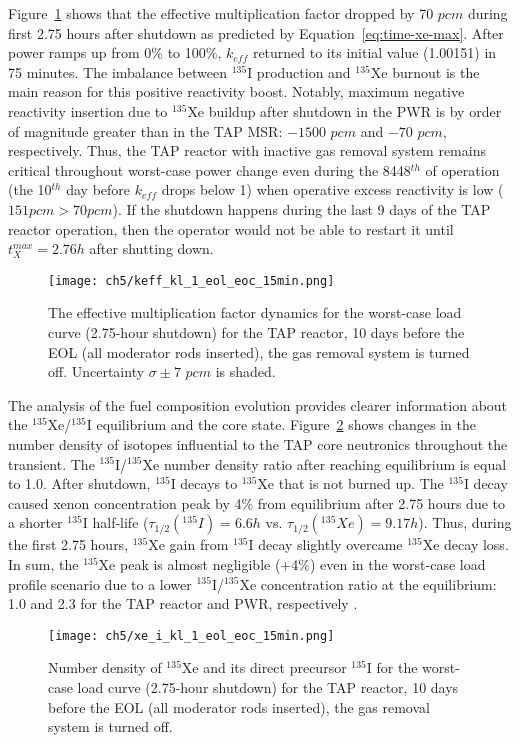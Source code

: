 Figure~\ref{fig:lf-tap-keff-eol-eoc-no-15} shows that the effective 
multiplication factor dropped by 70 $pcm$ during first 2.75 hours after 
shutdown as predicted by Equation~\ref{eq:time-xe-max}. After power ramps up 
from 0\% to 100\%, $k_{eff}$ returned to its initial value (1.00151) in 75 
minutes. The imbalance between $^{135}$I production and $^{135}$Xe burnout is 
the main reason for this positive reactivity boost. Notably, maximum negative 
reactivity insertion due to $^{135}$Xe buildup after shutdown in the 
\gls{PWR} is by order of magnitude greater than in the \gls{TAP} \gls{MSR}: 
$-1500$ $pcm$ \cite{rykhlevskii_impact_2019} and $-70$ $pcm$, respectively.
Thus, the \gls{TAP} reactor with inactive gas removal system remains critical 
throughout worst-case power change even during the 8448$^{th}$ of operation 
(the 10$^{th}$ day before $k_{eff}$ drops below 1) when operative excess 
reactivity is low ($151pcm>70pcm$). If the shutdown happens during the last 9 
days of the \gls{TAP} reactor operation, then the operator would not be able 
to restart it until $t^{max}_X=2.76h$ after shutting down.
\begin{figure}[htp!] %
	\centering
	\texttt{[image: ch5/keff\_kl\_1\_eol\_eoc\_15min.png]}
	\caption{The effective multiplication factor dynamics for the worst-case 
		load curve (2.75-hour shutdown) for the \gls{TAP} reactor, 10 days 
		before the \gls{EOL} (all moderator rods inserted), the gas removal 
		system is turned off. Uncertainty $\sigma\pm7$ $pcm$ is shaded.}
	\label{fig:lf-tap-keff-eol-eoc-no-15}
\end{figure}


The analysis of the fuel composition evolution provides clearer information 
about the $^{135}$Xe/$^{135}$I equilibrium and the core state. 
Figure~\ref{fig:lf-tap-xe-i-eol-eoc-no-15} shows changes in the number density 
of isotopes influential to the \gls{TAP} core neutronics throughout the 
transient. The $^{135}$I/$^{135}$Xe number density ratio after reaching 
equilibrium is equal to 1.0. After shutdown, $^{135}$I decays to $^{135}$Xe 
that is not burned up. The $^{135}$I decay caused xenon concentration 
peak by 4\% from equilibrium after 2.75 hours due to a shorter $^{135}$I 
half-life ($\tau_{1/2}(^{135}I)=6.6h$ vs. $\tau_{1/2}(^{135}Xe)=9.17h$). Thus, 
during the first 2.75 hours, $^{135}$Xe gain from $^{135}$I decay slightly 
overcame $^{135}$Xe decay loss. In sum, the $^{135}$Xe peak is almost 
negligible (+4\%) even in the worst-case load profile scenario due to a lower 
$^{135}$I/$^{135}$Xe concentration ratio at the equilibrium: 1.0 and 2.3 for 
the \gls{TAP} reactor and \gls{PWR}, respectively 
\cite{rykhlevskii_impact_2019}.
\begin{figure}[htp!] %
	\centering
	\texttt{[image: ch5/xe\_i\_kl\_1\_eol\_eoc\_15min.png]}
	\caption{Number density of $^{135}$Xe and its direct precursor $^{135}$I 
	for the worst-case load curve (2.75-hour shutdown) for the \gls{TAP} 
	reactor, 10 days before the \gls{EOL} (all moderator rods inserted), the 
	gas removal system is turned off.}
	\label{fig:lf-tap-xe-i-eol-eoc-no-15}
\end{figure}

